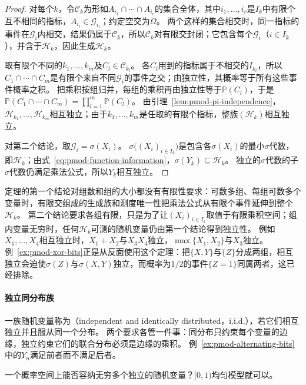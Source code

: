 \begin{proof}
对每个$k$，令$\mathcal C_k$为形如$A_{i_1}\cap\cdots\cap A_{i_r}$的集合全体，其中$i_1,\dots,i_r$是$I_k$中有限个互不相同的指标，$A_{i_l}\in\mathcal G_{i_l}$；约定空交为$\Omega$。
两个这样的集合相交时，同一指标的事件在$\mathcal G_i$内相交，结果仍属于$\mathcal C_k$，所以$\mathcal C_k$对有限交封闭；它包含每个$\mathcal G_i$（$i\in I_k$），并含于$\mathcal H_k$，因此生成$\mathcal H_k$。

取有限个不同的$k_1,\dots,k_m$及$C_l\in\mathcal C_{k_l}$。
各$C_l$用到的指标属于不相交的$I_{k_l}$，所以$C_1\cap\cdots\cap C_m$是有限个来自不同$\mathcal G_i$的事件之交；由独立性，其概率等于所有这些事件概率之积。
把乘积按组归并，每组的乘积再由独立性等于$\mathbb P(C_l)$，于是
$\mathbb P(C_1\cap\cdots\cap C_m)=\prod_{l=1}^m\mathbb P(C_l)$。
由引理~\ref{lem:pmod-pi-independence}，$\mathcal H_{k_1},\dots,\mathcal H_{k_m}$相互独立；由于$k_1,\dots,k_m$是任取的有限个指标，整族$(\mathcal H_k)$相互独立。

对第二个结论，取$\mathcal G_i=\sigma(X_i)$。
$\sigma\bigl((X_i)_{i\in I_k}\bigr)$是包含各$\sigma(X_i)$的最小$\sigma$代数，即$\mathcal H_k$；由式~\eqref{eq:pmod-function-information}，$\sigma(Y_k)\subseteq\mathcal H_k$。
独立的$\sigma$代数的子$\sigma$代数仍满足乘法公式，所以$Y_k$相互独立。
\end{proof}

定理的第一个结论对组数和组的大小都没有有限性要求：可数多组、每组可数多个变量时，有限交组成的生成族和测度唯一性把乘法公式从有限个事件延伸到整个$\mathcal H_k$。
第二个结论要求各组有限，只是为了让$(X_i)_{i\in I_k}$取值于有限乘积空间；组内变量无穷时，任何$\mathcal H_k$可测的随机变量仍由第一个结论得到独立性。
例如$X_1,\dots,X_4$相互独立时，$X_1+X_2$与$X_3X_4$独立，$\max\{X_1,X_2\}$与$X_3$独立。
例~\ref{ex:pmod-xor-bits}正是从反面使用这个定理：把$\{X,Y\}$与$\{Z\}$分成两组，相互独立会迫使$\sigma(Z)$与$\sigma(X,Y)$独立，而概率为$1/2$的事件$\{Z=1\}$同属两者，这已经排除。

\paragraph{独立同分布族}
一族随机变量称为（independent and identically distributed，i.i.d.），若它们相互独立并且服从同一个分布。
两个要求各管一件事：同分布只约束每个变量的边缘，独立约束它们的联合分布必须是边缘的乘积。
例~\ref{ex:pmod-alternating-bits}中的$Y_n$满足前者而不满足后者。

一个概率空间上能否容纳无穷多个独立的随机变量？$[0,1)$均匀模型就可以。


